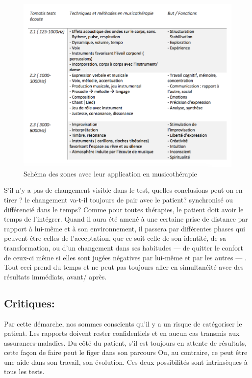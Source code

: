         \begin{figure}
	\centering
	\includegraphics[width=1\linewidth]{images/testtechnmethbut}
	\caption[Zones du test avec la musicothérapie]{Schéma des
          zones avec leur application en musicothérapie}
       
	\label{testbutetfonction}
\end{figure}



S'il n'y a pas de changement visible dans le test, quelles conclusions
peut-on en tirer ? le changement va-t-il toujours de pair avec le
patient? synchronisé ou différencié dans le temps?
Comme pour toutes thérapies, le patient doit avoir le temps de l'intégrer. Quand
il aura été amené à une certaine prise de distance par rapport à
lui-même et à son environnement, il passera par différentes phases qui peuvent être celles de l'acceptation, que ce soit celle de son identité, de sa transformation, ou d'un changement dans ses habitudes --- de quitter le confort de ceux-ci même si elles sont jugées négatives par lui-même et par les autres --- . Tout ceci prend du temps et ne peut pas 
toujours  aller en simultanéité avec des résultats immédiats, avant/ après.

\subsection{Critiques: }

Par cette démarche, nos sommes conscients qu'il y a un risque de catégoriser le patient. Les
rapports doivent rester confidentiels et en aucun cas transmis
aux assurances-maladies.
Du côté du patient, s'il est toujours en
attente de résultats, cette façon de faire peut le figer dans son parcours  Ou, au contraire, ce peut être une aide 
dans son travail, son évolution. Ces deux possibilités sont
intrinsèques à tous les tests.

